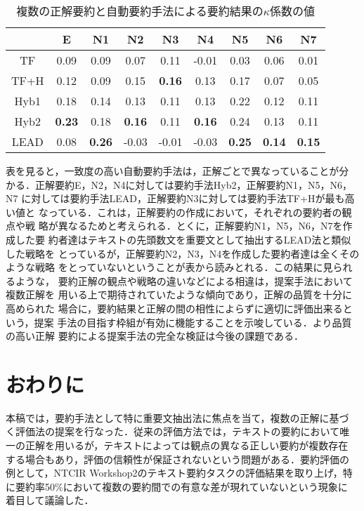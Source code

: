 \begin{table*}
\begin{center}
\caption{複数の正解要約と自動要約手法による要約結果の$\kappa$係数の値}
\begin{tabular}{|c||c|c|c|c|c|c|c|c|} \hline
  & E & N1 & N2 & N3 & N4 & N5 & N6 & N7 \\ \hline\hline
TF & 0.09 & 0.09 & 0.07 & 0.11 & -0.01 & 0.03 & 0.06 & 0.01 \\ \hline
TF+H & 0.12 & 0.09 & 0.15 & {\bf 0.16} & 0.13 & 0.17 & 0.07 & 0.05 \\ \hline
Hyb1 & 0.18 & 0.14 & 0.13 & 0.11 & 0.13 & 0.22 & 0.12 & 0.11 \\ \hline
Hyb2 & {\bf 0.23} & 0.18 & {\bf 0.16} & 0.11 & {\bf 0.16} & 0.24 & 0.13 & 0.11 \\ \hline
LEAD & 0.08 & {\bf 0.26} & -0.03 & -0.01 & -0.03 & {\bf 0.25} & {\bf 0.14} & {\bf 0.15} \\ \hline
\end{tabular}
\label{kappa-human-machine}
\end{center}
\end{table*}

表を見ると，一致度の高い自動要約手法は，正解ごとで異なっていることが分
かる．正解要約E，N2，N4に対しては要約手法Hyb2，正解要約N1，N5，N6，N7
に対しては要約手法LEAD，正解要約N3に対しては要約手法TF+Hが最も高い値と
なっている．これは，正解要約の作成において，それぞれの要約者の観点や戦
略が異なるためと考えられる．とくに，正解要約N1，N5，N6，N7を作成した要
約者達はテキストの先頭数文を重要文として抽出するLEAD法と類似した戦略を
とっているが，正解要約N2，N3，N4を作成した要約者達は全くそのような戦略
をとっていないということが表から読みとれる．この結果に見られるような，
要約正解の観点や戦略の違いなどによる相違は，提案手法において複数正解を
用いる上で期待されていたような傾向であり，正解の品質を十分に高められた
場合に，要約結果と正解の間の相性によらずに適切に評価出来るという，提案
手法の目指す枠組が有効に機能することを示唆している．より品質の高い正解
要約による提案手法の完全な検証は今後の課題である．

\section{おわりに}

本稿では，要約手法として特に重要文抽出法に焦点を当て，複数の正解に基づ
く評価法の提案を行なった．従来の評価方法では，テキストの要約において唯
一の正解を用いるが，テキストによっては観点の異なる正しい要約が複数存在
する場合もあり，評価の信頼性が保証されないという問題がある．要約評価の
例として，NTCIR Workshop2のテキスト要約タスクの評価結果を取り上げ，特
に要約率50\%において複数の要約間での有意な差が現れていないという現象に
着目して議論した．

